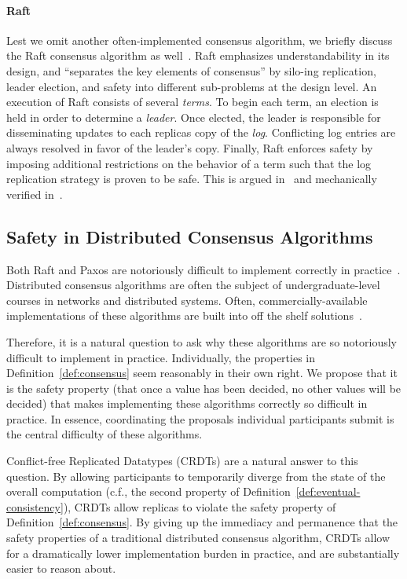\paragraph{Raft}
Lest we omit another often-implemented consensus algorithm, we briefly discuss
the Raft consensus algorithm as well~\citep{ongaro14}. Raft emphasizes
understandability in its design, and ``separates the key elements of consensus''
by silo-ing replication, leader election, and safety into different sub-problems
at the design level. An execution of Raft consists of several \textit{terms}. To
begin each term, an election is held in order to determine a \textit{leader}.
Once elected, the leader is responsible for disseminating updates to each
replicas copy of the \textit{log}. Conflicting log entries are always resolved
in favor of the leader's copy. Finally, Raft enforces safety by imposing
additional restrictions on the behavior of a term such that the log replication
strategy is proven to be safe. This is argued in~\citep{ongaro14} and
mechanically verified in~\citep{wilcox15}.

\subsection{Safety in Distributed Consensus Algorithms}

\sloppy
Both Raft and Paxos are notoriously difficult to implement correctly in
practice~\citep{howard20}. Distributed consensus algorithms are often the
subject of undergraduate-level courses in networks and distributed systems.
Often, commercially-available implementations of these algorithms are built into
off the shelf solutions~\citep{etcd,zookeeper}.

Therefore, it is a natural question to ask why these algorithms are so
notoriously difficult to implement in practice. Individually, the properties in
Definition~\ref{def:consensus} seem reasonably in their own right. We propose
that it is the safety property (that once a value has been decided, no other
values will be decided) that makes implementing these algorithms correctly so
difficult in practice. In essence, coordinating the proposals individual
participants submit is the central difficulty of these algorithms.

Conflict-free Replicated Datatypes (CRDTs) are a natural answer to this
question. By allowing participants to temporarily diverge from the state of the
overall computation (c.f., the second property of
Definition~\ref{def:eventual-consistency}), CRDTs allow replicas to violate the
safety property of Definition~\ref{def:consensus}. By giving up the immediacy
and permanence that the safety properties of a traditional distributed consensus
algorithm, CRDTs allow for a dramatically lower implementation burden in
practice, and are substantially easier to reason about.

